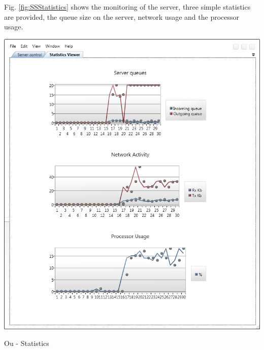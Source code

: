 	\normalsize
	{
		Fig. \ref{fig:SSStatistics} shows the monitoring of the server, three simple statistics
		are provided, the queue size on the server, network usage and the processor usage.
		\newline			
	}

	\begin{figurehere}
		\centering
		\includegraphics[scale=0.75]{pages/appendix3/figures/lgpscreens/statistics.png}
		\caption{Ou - Statistics}
		\label{fig:SSStatistics}
	\end{figurehere}

\newpage